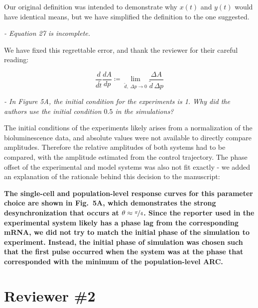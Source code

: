 \documentclass[11pt, letterpaper]{article}
\newenvironment{reviewer}{\itshape\color{gray}}{}
\newenvironment{manuscript}[1]{\begin{center}\begin{tcolorbox}[colback=green!5!white,colframe=green!75!black,width=0.8\textwidth,title={#1},breakable,fonttitle=\bfseries]}{\end{tcolorbox}\end{center}}
\begin{document}
Our original definition was intended to demonstrate why $x(t)$ and $y(t)$ would have identical means, but we have simplified the definition to the one suggested.

\begin{reviewer}
- Equation 27 is incomplete. 
\end{reviewer}
 
We have fixed this regrettable error, and thank the reviewer for their careful reading:

\begin{manuscript}{Page 10}
\begin{equation}
  \frac{d}{d\tilde{t}}\frac{dA}{dp} \coloneqq \lim_{\tilde{d},\; \Delta p \to 0} \frac{\Delta A}{\tilde{d}\, \Delta p}
  \tag{31}
\end{equation}
\end{manuscript}

\begin{reviewer}
- In Figure 5A, the initial condition for the experiments is 1. Why did the authors use the initial condition $0.5$ in the simulations?
\end{reviewer}

The initial conditions of the experiments likely arises from a normalization of the bioluminescence data, and absolute values were not available to directly compare amplitudes.
Therefore the relative amplitudes of both systems had to be compared, with the amplitude estimated from the control trajectory.
The phase offset of the experimental and model systems was also not fit exactly - we added an explanation of the rationale behind this decision to the manuscript:

\begin{manuscript}{Page 16}
\bfseries
The single-cell and population-level response curves for this parameter choice are shown in Fig.~5A, which demonstrates the strong desynchronization that occurs at $\theta\approx\nicefrac{\pi}{4}$.
Since the reporter used in the experimental system likely has a phase lag from the corresponding mRNA, we did not try to match the initial phase of the simulation to experiment.
Instead, the initial phase of simulation was chosen such that the first pulse occurred when the system was at the phase that corresponded with the minimum of the population-level ARC.
\end{manuscript}

\section*{Reviewer \#2}
\end{document}
